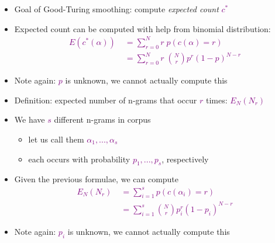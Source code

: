 \documentclass[landscape]{slides}
\newcommand{\maths}[1]{\textcolor{purple}{#1}}
\begin{document}
\vspace{10mm}
\begin{itemize}
\item Goal of Good-Turing smoothing: compute {\em expected count} \maths{$c^*$}
\item Expected count can be computed with help from binomial distribution:
\maths{\begin{equation*}
\begin{split}
E(c^*(\alpha)) \; &= \sum_{r=0}^N r \; p(c(\alpha)=r)\\
&= \sum_{r=0}^N r \; \binom{N}{r}p^r(1-p)^{N-r}
\end{split}
\end{equation*}}
\vspace{-12mm}
\item Note again: \maths{$p$} is unknown, we cannot actually compute this
\end{itemize}


\begin{itemize}
\item Definition: expected number of n-grams that occur \maths{$r$} times: \maths{$E_N(N_r)$}
\item We have \maths{$s$} different n-grams in corpus
\vspace{-3mm}
\begin{itemize}
\item let us call them \maths{$\alpha_1,...,\alpha_s$}
\item each occurs with probability \maths{$p_1,...,p_s$}, respectively
\end{itemize}
\item Given the previous formulae, we can compute
\maths{\begin{equation*}
\begin{split}
E_N(N_r) \;&= \sum_{i=1}^s p(c(\alpha_i)=r)\\
&= \sum_{i=1}^s \binom{N}{r}p_i^r(1-p_i)^{N-r}
\end{split}
\end{equation*}}
\vspace{-12mm}
\item Note again: \maths{$p_i$} is unknown, we cannot actually compute this
\end{itemize}

\end{document}
